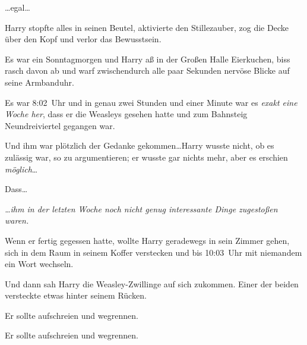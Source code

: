 …egal…

Harry stopfte alles in seinen Beutel, aktivierte den Stillezauber, zog die Decke über den Kopf und verlor das Bewusstsein.

\later

Es war ein Sonntagmorgen und Harry aß in der Großen Halle Eierkuchen, biss rasch davon ab und warf zwischendurch alle paar Sekunden nervöse Blicke auf seine Armbanduhr.

Es war 8:02~Uhr und in genau zwei Stunden und einer Minute war es \emph{exakt eine Woche her}, dass er die Weasleys gesehen hatte und zum Bahnsteig Neundreiviertel gegangen war.

Und ihm war plötzlich der Gedanke gekommen…Harry wusste nicht, ob es zulässig war, so zu argumentieren; er wusste gar nichts mehr, aber es erschien \emph{möglich}…

Dass…

\emph{…ihm in der letzten Woche noch nicht genug interessante Dinge zugestoßen waren.}

Wenn er fertig gegessen hatte, wollte Harry geradewegs in sein Zimmer gehen, sich in dem Raum in seinem Koffer verstecken und bis 10:03~Uhr mit niemandem ein Wort wechseln.

Und dann sah Harry die Weasley-Zwillinge auf sich zukommen. Einer der beiden versteckte etwas hinter seinem Rücken.

Er sollte aufschreien und wegrennen.

Er sollte aufschreien und wegrennen.


